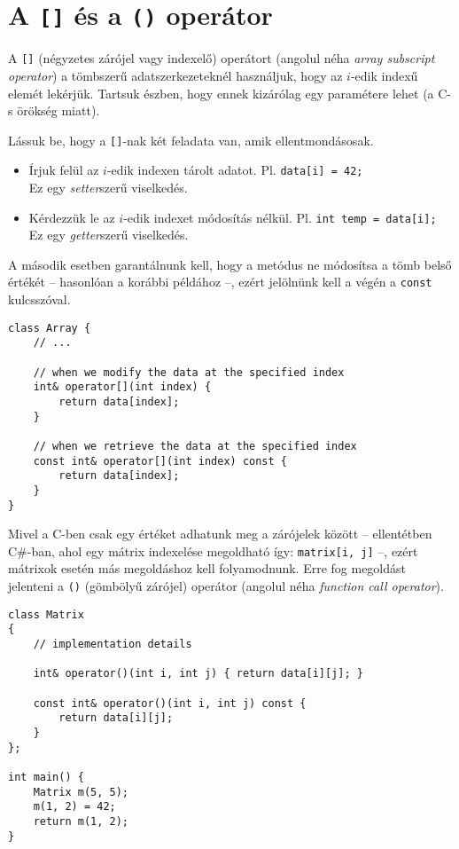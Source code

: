 \documentclass[a4paper, 11pt, oneside]{book}
\begin{document}
\section{A \texttt{[]} és a \texttt{()} operátor}

A \verb*|[]| (négyzetes zárójel vagy indexelő) operátort (angolul néha \textit{array subscript operator}) a tömbszerű adatszerkezeteknél használjuk, hogy az $i$-edik indexű elemét lekérjük. Tartsuk észben, hogy ennek kizárólag egy paramétere lehet (a C-s örökség miatt).

Lássuk be, hogy a \verb*|[]|-nak két feladata van, amik ellentmondásosak.

\begin{itemize}
	\item Írjuk felül az $i$-edik indexen tárolt adatot. Pl. \verb|data[i] = 42;| \\ Ez egy \textit{setter}szerű viselkedés.
	\item Kérdezzük le az $i$-edik indexet módosítás nélkül. Pl. \verb|int temp = data[i];| \\ Ez egy \textit{getter}szerű viselkedés.
\end{itemize}

A második esetben garantálnunk kell, hogy a metódus ne módosítsa a tömb belső értékét -- hasonlóan a korábbi példához --, ezért jelölnünk kell a végén a \verb*|const| kulcsszóval.

\begin{lstlisting}[style=cppstyle]
class Array {
	// ...
	
	// when we modify the data at the specified index
	int& operator[](int index) { 
		return data[index]; 
	}
	
	// when we retrieve the data at the specified index
	const int& operator[](int index) const { 
		return data[index]; 
	}
}
\end{lstlisting}

Mivel a C-ben csak egy értéket adhatunk meg a zárójelek között -- ellentétben C\#-ban, ahol egy mátrix indexelése megoldható így: \verb|matrix[i, j]| --, ezért mátrixok esetén más megoldáshoz kell folyamodnunk. Erre fog megoldást jelenteni a \verb*|()| (gömbölyű zárójel) operátor (angolul néha \textit{function call operator}).

\begin{lstlisting}[style=cppstyle]
class Matrix 
{
	// implementation details
	
	int& operator()(int i, int j) { return data[i][j]; }
	
	const int& operator()(int i, int j) const { 
		return data[i][j]; 
	}
};

int main() {
	Matrix m(5, 5);
	m(1, 2) = 42;
	return m(1, 2);
}
\end{lstlisting}
\end{document}
